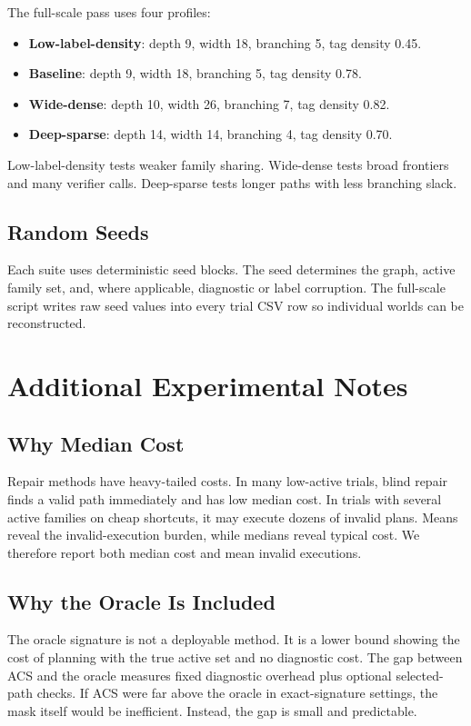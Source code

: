 \documentclass{article}
\newcommand{\ACS}{\textsc{ACS}}
\begin{document}
The full-scale pass uses four profiles:
\begin{itemize}
    \item \textbf{Low-label-density}: depth 9, width 18, branching 5, tag density 0.45.
    \item \textbf{Baseline}: depth 9, width 18, branching 5, tag density 0.78.
    \item \textbf{Wide-dense}: depth 10, width 26, branching 7, tag density 0.82.
    \item \textbf{Deep-sparse}: depth 14, width 14, branching 4, tag density 0.70.
\end{itemize}
Low-label-density tests weaker family sharing. Wide-dense tests broad frontiers and many verifier calls. Deep-sparse tests longer paths with less branching slack.

\subsection{Random Seeds}

Each suite uses deterministic seed blocks. The seed determines the graph, active family set, and, where applicable, diagnostic or label corruption. The full-scale script writes raw seed values into every trial CSV row so individual worlds can be reconstructed.

\section{Additional Experimental Notes}

\subsection{Why Median Cost}

Repair methods have heavy-tailed costs. In many low-active trials, blind repair finds a valid path immediately and has low median cost. In trials with several active families on cheap shortcuts, it may execute dozens of invalid plans. Means reveal the invalid-execution burden, while medians reveal typical cost. We therefore report both median cost and mean invalid executions.

\subsection{Why the Oracle Is Included}

The oracle signature is not a deployable method. It is a lower bound showing the cost of planning with the true active set and no diagnostic cost. The gap between \ACS{} and the oracle measures fixed diagnostic overhead plus optional selected-path checks. If \ACS{} were far above the oracle in exact-signature settings, the mask itself would be inefficient. Instead, the gap is small and predictable.
\end{document}
